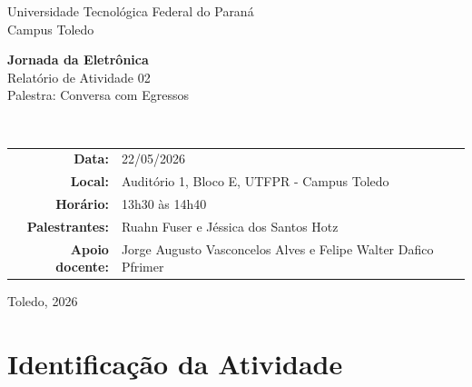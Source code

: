 \documentclass[12pt,a4paper]{article}
\begin{document}
\begin{titlepage}
    \thispagestyle{empty}
    \begin{center}
        \vspace*{1.2cm}
        {\Large Universidade Tecnológica Federal do Paraná}\\
        {\large Campus Toledo}\\[1.6cm]

        \colorbox{utfpryellow}{%
            \begin{minipage}{0.88\textwidth}
                \centering
                \vspace{0.8cm}
                {\Huge\bfseries Jornada da Eletrônica}\\[0.3cm]
                {\Large Relatório de Atividade 02}\\[0.3cm]
                {\Large Palestra: Conversa com Egressos}
                \vspace{0.8cm}
            \end{minipage}
        }\\[1.8cm]

        \begin{tabular}{rl}
            \textbf{Data:} & 22/05/2026 \\
            \textbf{Local:} & Auditório 1, Bloco E, UTFPR - Campus Toledo \\
            \textbf{Horário:} & 13h30 às 14h40 \\
            \textbf{Palestrantes:} & Ruahn Fuser e Jéssica dos Santos Hotz \\
            \textbf{Apoio docente:} & Jorge Augusto Vasconcelos Alves e Felipe Walter Dafico Pfrimer \\
        \end{tabular}

        \vfill
        Toledo, 2026
    \end{center}
\end{titlepage}

\section{Identificação da Atividade}
\end{document}
